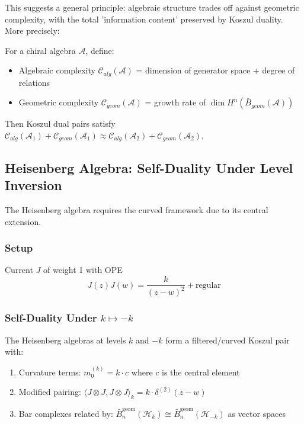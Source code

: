 This suggests a general principle: algebraic structure trades off against geometric complexity, with the total 'information content' preserved by Koszul duality. More precisely:

\begin{conjecture}
For a chiral algebra $\mathcal{A}$, define:
\begin{itemize}
\item Algebraic complexity $\mathcal{C}_{alg}(\mathcal{A})$ = dimension of generator space + degree of relations
\item Geometric complexity $\mathcal{C}_{geom}(\mathcal{A})$ = growth rate of $\dim H^n(\bar{B}_{geom}(\mathcal{A}))$
\end{itemize}
Then Koszul dual pairs satisfy $\mathcal{C}_{alg}(\mathcal{A}_1) + \mathcal{C}_{geom}(\mathcal{A}_1) \approx \mathcal{C}_{alg}(\mathcal{A}_2) + \mathcal{C}_{geom}(\mathcal{A}_2)$.
\end{conjecture}


\subsection{Heisenberg Algebra: Self-Duality Under Level Inversion}
 
The Heisenberg algebra requires the curved framework due to its central extension.
 
\subsubsection{Setup}
 
Current $J$ of weight 1 with OPE
\[
J(z)J(w) = \frac{k}{(z-w)^2} + \text{regular}
\]
 
\subsubsection{Self-Duality Under $k \mapsto -k$}
 
\begin{theorem}
The Heisenberg algebras at levels $k$ and $-k$ form a filtered/curved Koszul pair with:
\begin{enumerate}
\item Curvature terms: $m_0^{(k)} = k \cdot c$ where $c$ is the central element
\item Modified pairing: $\langle J \otimes J, J \otimes J \rangle_k = k \cdot \delta^{(2)}(z-w)$
\item Bar complexes related by: $\bar{B}^{\text{geom}}_n(\mathcal{H}_k) \cong \bar{B}^{\text{geom}}_n(\mathcal{H}_{-k})$ as vector spaces
\end{enumerate}
\end{theorem}
 
